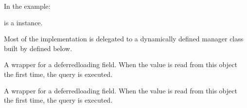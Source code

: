 \documentclass[a4paper,11pt,spanish]{sphinxmanual}
\begin{document}
\begin{fulllineitems}
\begin{fulllineitems}
\sphinxAtStartPar
In the example:

\begin{sphinxVerbatim}[commandchars=\\\{\}]
       
\end{sphinxVerbatim}

\sphinxAtStartPar
{} is a  instance.

\sphinxAtStartPar
Most of the implementation is delegated to a dynamically defined manager
class built by  defined below.

\end{fulllineitems}


\begin{fulllineitems}
\label{\detokenize{api/inventory/inventory.models:inventory.models.Location.code}}
\pysigstartsignatures
\pysigline
{}
\pysigstopsignatures
\sphinxAtStartPar
A wrapper for a deferred\sphinxhyphen{}loading field. When the value is read from this
object the first time, the query is executed.

\end{fulllineitems}


\begin{fulllineitems}
\label{\detokenize{api/inventory/inventory.models:inventory.models.Location.id_location}}
\pysigstartsignatures
\pysigline
{}
\pysigstopsignatures
\sphinxAtStartPar
A wrapper for a deferred\sphinxhyphen{}loading field. When the value is read from this
object the first time, the query is executed.

\end{fulllineitems}



\end{fulllineitems}
\end{document}
